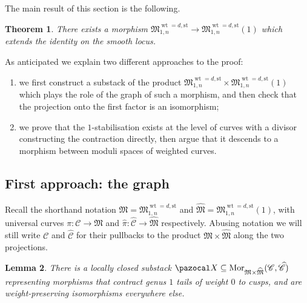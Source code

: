 \documentclass[11pt]{amsart}
\renewcommand{\to}{\rightarrow}
\newcommand{\X}{\pazocal X}
\newcommand{\cC}{\mathcal C}
\newcommand{\hC}{\widehat{\mathcal C}}
\newcommand{\MM}{\mathfrak M}
\newcommand{\hM}{\widehat{\mathfrak M}}
\theoremstyle{plain}
\newtheorem{thm}{Theorem}[section]
\newtheorem{lem}[thm]{Lemma}
\theoremstyle{definition}
\begin{document}
The main result of this section is the following.

\begin{thm}
There exists a morphism $\mathfrak M_{1,n}^{\operatorname{wt}=d,\text{st}}\to\mathfrak M_{1,n}^{\operatorname{wt}=d,\text{st}}(1)$ which extends the identity on the smooth locus.
\end{thm} 
As anticipated we explain two different approaches to the proof:
\begin{enumerate}
 \item we first construct a substack of the product $\mathfrak M_{1,n}^{\operatorname{wt}=d,\text{st}}\times\mathfrak M_{1,n}^{\operatorname{wt}=d,\text{st}}(1)$ which plays the role of the graph of such a morphism, and then check that the projection onto the first factor is an isomorphism;
\item we prove that the $1$-stabilisation exists at the level of curves with a divisor constructing the contraction directly, then argue that it descends to a morphism between moduli spaces of weighted curves.
\end{enumerate}

\subsection{First approach: the graph}

Recall the shorthand notation $\MM=\mathfrak M_{1,n}^{\operatorname{wt}=d,\text{st}}$ and $\hM=\mathfrak M_{1,n}^{\operatorname{wt}=d,\text{st}}(1)$, with universal curves $\pi\colon \cC\to \MM$ and $\hat\pi\colon\hC\to\hM$ respectively. Abusing notation we will still write $\cC$ and $\hC$ for their pullbacks to the product $\MM\times\hM$ along the two projections.

\begin{lem}\label{lemma:def_X}
 There is a locally closed substack $\X\subseteq\operatorname{Mor}_{\MM\times\hM}(\cC,\hC)$ representing morphisms that contract genus $1$ tails of weight $0$ to cusps, and are weight-preserving isomorphisms everywhere else. 
\end{lem}
\end{document}
